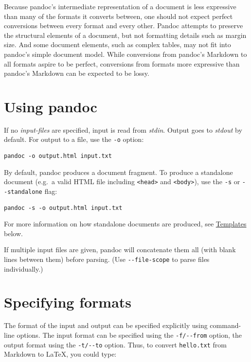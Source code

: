 \documentclass[
  b5paper
]{book}
\begin{document}
Because pandoc's intermediate representation of a document is less
expressive than many of the formats it converts between, one should not
expect perfect conversions between every format and every other. Pandoc
attempts to preserve the structural elements of a document, but not
formatting details such as margin size. And some document elements, such
as complex tables, may not fit into pandoc's simple document model.
While conversions from pandoc's Markdown to all formats aspire to be
perfect, conversions from formats more expressive than pandoc's Markdown
can be expected to be lossy.

\section{Using pandoc}\label{using-pandoc}

If no \emph{input-files} are specified, input is read from \emph{stdin}.
Output goes to \emph{stdout} by default. For output to a file, use the
\texttt{-o} option:

\begin{verbatim}
pandoc -o output.html input.txt
\end{verbatim}

By default, pandoc produces a document fragment. To produce a standalone
document (e.g.~a valid HTML file including
\texttt{\textless{}head\textgreater{}} and
\texttt{\textless{}body\textgreater{}}), use the \texttt{-s} or
\texttt{-\/-standalone} flag:

\begin{verbatim}
pandoc -s -o output.html input.txt
\end{verbatim}

For more information on how standalone documents are produced, see
\hyperref[templates]{Templates} below.

If multiple input files are given, pandoc will concatenate them all
(with blank lines between them) before parsing. (Use
\texttt{-\/-file-scope} to parse files individually.)

\section{Specifying formats}\label{specifying-formats}

The format of the input and output can be specified explicitly using
command-line options. The input format can be specified using the
\texttt{-f/-\/-from} option, the output format using the
\texttt{-t/-\/-to} option. Thus, to convert \texttt{hello.txt} from
Markdown to LaTeX, you could type:
\end{document}
